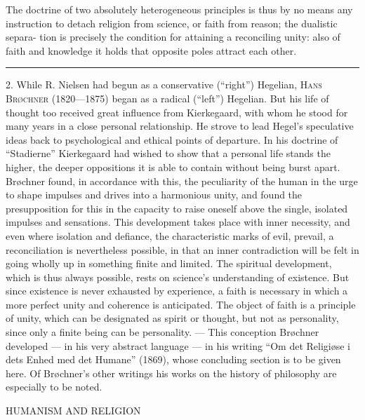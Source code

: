 \documentclass[12pt,a4paper,openany]{book}
\newcommand{\opage}[1]{\marginnote{\footnotesize\textit{[#1]}}}
\newcommand{\excerpthead}[1]{\par\bigskip\begin{center}#1\end{center}\nopagebreak\smallskip}
\newenvironment{intro}{\par}{\par}
\newcommand{\sectionrule}{\par\begin{center}\rule{4em}{0.4pt}\end{center}}
\begin{document}
The doctrine of two absolutely heterogeneous principles is thus by no means any
instruction to detach religion from science, or faith from reason; the dualistic
separa-
\setcounter{footnote}{0}%
\opage{214}tion is precisely the condition for attaining a reconciling unity: also of faith
and knowledge it holds that opposite poles attract each other.

\sectionrule

\begin{intro}

2. While R. Nielsen had begun as a conservative (``right'') Hegelian, \textsc{Hans}
\textsc{Brøchner} (1820---1875) began as a radical (``left'') Hegelian. But his life of
thought too received great influence from Kierkegaard, with whom he stood for many
years in a close personal relationship. He strove to lead Hegel's speculative ideas
back to psychological and ethical points of departure. In his doctrine of ``Stadierne''
Kierkegaard had wished to show that a personal life stands the higher, the deeper
oppositions it is able to contain without being burst apart. Brøchner found, in
accordance with this, the peculiarity of the human in the urge to shape impulses and
drives into a harmonious unity, and found the presupposition for this in the capacity
to raise oneself above the single, isolated impulses and sensations. This development
takes place with inner necessity, and even where isolation and defiance, the
characteristic marks of evil, prevail, a reconciliation is nevertheless possible, in
that an inner contradiction will be felt in going wholly up in something finite and
limited. The spiritual development, which is thus always possible, rests on science's
understanding of existence. But since existence is never exhausted by experience, a
faith is necessary in which a more perfect unity and coherence is anticipated. The
object of faith is a principle of unity, which can be designated as spirit or thought,
but not as personality, since only a finite being can be personality. --- This
conception Brøchner developed --- in his very abstract language --- in his writing
``Om det Religiøse i dets Enhed med det Humane'' (1869), whose concluding section is
to be given here. Of Brøchner's other writings his works on the history of philosophy
are especially to be noted.
\end{intro}

\excerpthead{HUMANISM AND RELIGION}
\end{document}
